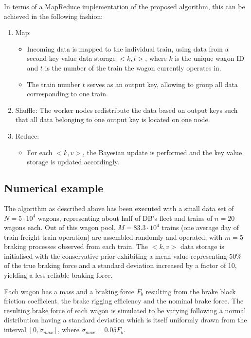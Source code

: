 \documentclass[a4paper, 12pt]{scrartcl}
\begin{document}
In terms of a MapReduce implementation of the proposed algorithm, this can be achieved in the following fashion:
\begin{enumerate}
	\item Map: 
	\begin{itemize}
		\item Incoming data is mapped to the individual train, using data from a second key value data storage $<k, t>$, where $k$ is the unique wagon ID and $t$ is the number of the train the wagon currently operates in.
		\item The train number $t$ serves as an output key, allowing to group all data corresponding to one train.
		\end{itemize}
	\item Shuffle: The worker nodes redistribute the data based on output keys such that all data belonging to one output key is located on one node.
	\item Reduce: 
	\begin{itemize}
		\item For each $<k, v>$, the Bayesian update is performed and the key value storage is updated accordingly.
		\end{itemize}
\end{enumerate}

\subsection{Numerical example}
The algorithm as described above has been executed with a small data set of $N = 5 \cdot 10^4$ wagons, representing about half of DB's fleet and trains of $n = 20$ wagons each. Out of this wagon pool, $M = 83.3 \cdot 10^4$ trains (one average day of train freight train operation) are assembled randomly and operated, with $m = 5$ braking processes observed from each train. The $<k,v>$ data storage is initialised with the conservative prior exhibiting a mean value representing 50\% of the true braking force and a standard deviation increased by a factor of 10, yielding a less reliable braking force.

Each wagon has a mass and a braking force $F_{b}$ resulting from the brake block friction coefficient, the brake rigging efficiency and the nominal brake force. The resulting brake force of each wagon is simulated to be varying following a normal distribution having a standard deviation which is itself uniformly drawn from the interval $\left[0, \sigma_{max}\right]$, where $\sigma_{max} = 0.05 F_{b}$.
\end{document}
